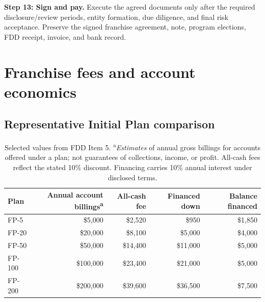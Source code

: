 \documentclass[10pt,letterpaper]{article}
\begin{document}
\textbf{Step 13: Sign and pay.} Execute the agreed documents only after the
required disclosure/review periods, entity formation, due diligence, and final
risk acceptance. Preserve the signed franchise agreement, note, program
elections, FDD receipt, invoice, and bank record.

\section{Franchise fees and account economics}
\subsection{Representative Initial Plan comparison}
\begin{table}[htbp]
\centering\small
\begin{tabular}{@{}l r r r r@{}}
\toprule
\textbf{Plan} & \textbf{Annual account billings\textsuperscript{a}} & \textbf{All-cash fee} & \textbf{Financed down} & \textbf{Balance financed}\\\midrule
FP-5 & \$5,000 & \$2,520 & \$950 & \$1,850\\
FP-20 & \$20,000 & \$8,100 & \$5,000 & \$4,000\\
FP-50 & \$50,000 & \$14,400 & \$11,000 & \$5,000\\
FP-100 & \$100,000 & \$23,400 & \$21,000 & \$5,000\\
FP-200 & \$200,000 & \$39,600 & \$36,500 & \$7,500\\
\bottomrule
\end{tabular}
\caption{Selected values from FDD Item 5. \textsuperscript{a}\emph{Estimates} of annual gross billings for accounts offered under a plan; not guarantees of collections, income, or profit. All-cash fees reflect the stated 10\% discount. Financing carries 10\% annual interest under disclosed terms.}
\end{table}
\end{document}
